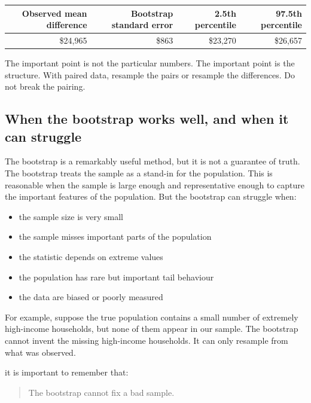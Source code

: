 \documentclass[
  letterpaper,
  DIV=11,
  numbers=noendperiod]{scrreprt}
\newcounter{none} %
\providecommand{\tightlist}{%
  \setlength{\itemsep}{0pt}\setlength{\parskip}{0pt}}
\begin{document}
\begin{table}
\fontsize{12.0pt}{14.0pt}\selectfont
\begin{tabular*}{\linewidth}{@{\extracolsep{\fill}}rrrr}
\toprule
Observed mean difference & Bootstrap standard error & 2.5th percentile & 97.5th percentile \\ 
\midrule\addlinespace[2.5pt]
\$24,965 & \$863 & \$23,270 & \$26,657 \\ 
\bottomrule
\end{tabular*}
\end{table}

The important point is not the particular numbers. The important point
is the structure. With paired data, resample the pairs or resample the
differences. Do not break the pairing.

\subsection{When the bootstrap works well, and when it can
struggle}\label{when-the-bootstrap-works-well-and-when-it-can-struggle}

The bootstrap is a remarkably useful method, but it is not a guarantee
of truth. The bootstrap treats the sample as a stand-in for the
population. This is reasonable when the sample is large enough and
representative enough to capture the important features of the
population. But the bootstrap can struggle when:

\begin{itemize}
\tightlist
\item
  the sample size is very small
\item
  the sample misses important parts of the population
\item
  the statistic depends on extreme values
\item
  the population has rare but important tail behaviour
\item
  the data are biased or poorly measured
\end{itemize}

For example, suppose the true population contains a small number of
extremely high-income households, but none of them appear in our sample.
The bootstrap cannot invent the missing high-income households. It can
only resample from what was observed.

it is important to remember that:

\begin{quote}
The bootstrap cannot fix a bad sample.
\end{quote}
\end{document}
